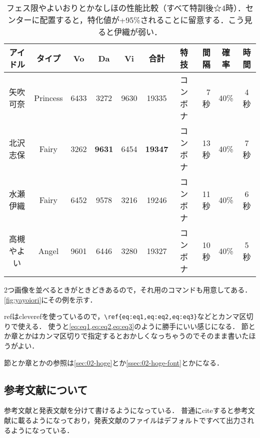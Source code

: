 \begin{table}
    \centering
    \caption[フェス限やよいおりとかなしほの性能比較]{フェス限やよいおりとかなしほの性能比較（すべて特訓後☆4時）．センターに配置すると，特化値が+95\%されることに留意する．こう見ると伊織が弱い．}
    \begin{tabular}{cc|cccc|crcc}
    アイドル & タイプ & Vo & Da  & Vi & 合計 & 特技 & 間隔 & 確率 & 時間 \\ \hline\hline
    矢吹可奈 & Princess & 6433 & 3272 & 9630 & 19335 & コンボナ & 7秒 & 40\% & 4秒 \\
    北沢志保 & Fairy & 3262 & \textbf{9631} & 6454 & \textbf{19347} & コンボナ & 13秒 & 40\% & 7秒 \\
    水瀬伊織 & Fairy & 6452 & 9578 & 3216 & 19246 & コンボナ & 11秒 & 40\% & 6秒 \\
    高槻やよい & Angel & 9601 & 6446 & 3280 & 19327 & コンボナ & 10秒 & 40\% & 5秒
    \end{tabular}
    \label{tbl:fes}
\end{table}

2つ画像を並べるときがときどきあるので，それ用のコマンドも用意してある．
\ref{fig:yayoiori}にその例を示す．


refはcleverefを使っているので，\verb|\ref{eq:eq1,eq:eq2,eq:eq3}|などとカンマ区切りで使える．
使うと\ref{eq:eq1,eq:eq2,eq:eq3}のように勝手にいい感じになる．
節とか章とかはカンマ区切りで指定するとおかしくなっちゃうのでそのまま書いたほうがよい．

節とか章とかの参照は\ref{sec:02-hoge}とか\ref{ssec:02-hoge-font}とかになる．

\subsection{参考文献について}

参考文献と発表文献を分けて書けるようになっている．
普通にciteすると参考文献に載るようになっており，発表文献のファイルはデフォルトですべて出力されるようになっている．
